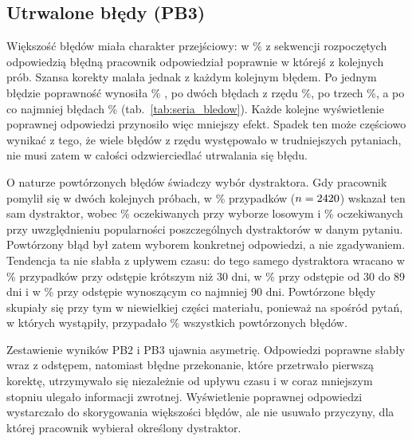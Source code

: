 \subsection{Utrwalone błędy (PB3)}
Większość błędów miała charakter przejściowy: w \EverCorrectedPct\% z \FirstWrongSeqN{} sekwencji
rozpoczętych odpowiedzią błędną pracownik odpowiedział poprawnie w którejś z kolejnych prób. Szansa
korekty malała jednak z każdym kolejnym błędem. Po jednym błędzie poprawność wynosiła \CorrRunOne\%
\CorrRunOneCI, po dwóch błędach z rzędu \CorrRunTwo\%, po trzech \CorrRunThree\%, a po co najmniej
\RunMax{} błędach \CorrRunMax\% \CorrRunMaxCI{} (tab.~\ref{tab:seria_bledow}). Każde kolejne
wyświetlenie poprawnej odpowiedzi przynosiło więc mniejszy efekt. Spadek ten może częściowo wynikać
z tego, że wiele błędów z rzędu występowało w trudniejszych pytaniach, nie musi zatem w całości odzwierciedlać
utrwalania się błędu.

O naturze powtórzonych błędów świadczy wybór dystraktora. Gdy pracownik pomylił się w dwóch kolejnych
próbach, w \SameDistractorPct\% \SameDistractorCI{} przypadków ($n = 2420$) wskazał ten sam
dystraktor, wobec \SameDistractorExpected\% oczekiwanych przy wyborze losowym
i \SameDistractorExpectedPop\% oczekiwanych przy uwzględnieniu popularności poszczególnych dystraktorów
w danym pytaniu. Powtórzony błąd był zatem wyborem konkretnej odpowiedzi, a nie zgadywaniem. Tendencja
ta nie słabła z upływem czasu: do tego samego dystraktora wracano w \SameDistrGapShort\% przypadków przy
odstępie krótszym niż 30 dni, w \SameDistrGapMid\% przy odstępie od 30 do 89 dni i w \SameDistrGapLong\%
przy odstępie wynoszącym co najmniej 90 dni. Powtórzone błędy skupiały się przy tym w niewielkiej części
materiału, ponieważ na \PersistTopItems{} spośród \PersistItems{} pytań, w których wystąpiły, przypadało
\PersistTopItemsShare\% wszystkich powtórzonych błędów.

Zestawienie wyników PB2 i PB3 ujawnia asymetrię. Odpowiedzi poprawne słabły wraz z odstępem, natomiast
błędne przekonanie, które przetrwało pierwszą korektę, utrzymywało się niezależnie od upływu czasu
i w coraz mniejszym stopniu ulegało informacji zwrotnej. Wyświetlenie poprawnej odpowiedzi wystarczało
do skorygowania większości błędów, ale nie usuwało przyczyny, dla której pracownik wybierał określony
dystraktor. %

\begin{table}[H]
\centering
\caption{Poprawność według liczby błędów popełnionych z rzędu bezpośrednio przed daną próbą.}
\label{tab:seria_bledow}
\footnotesize
\setlength{\tabcolsep}{5pt}
\end{table}

